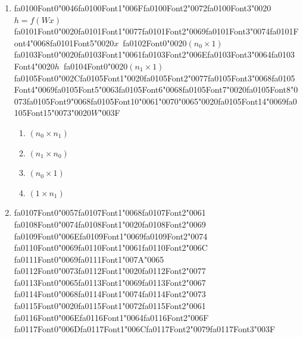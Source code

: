 \documentclass[12pt]{article}
\begin{document}
\begin{enumerate}[label=Q\arabic*.]
\item {\csname fa0100Font0\endcsname\char"0046}{\csname fa0100Font1\endcsname\char"006F}{\csname fa0100Font2\endcsname\char"0072}{\csname fa0100Font3\endcsname\char"0020}$h = f(Wx)${\csname fa0101Font0\endcsname\char"0020}{\csname fa0101Font1\endcsname\char"0077}{\csname fa0101Font2\endcsname\char"0069}{\csname fa0101Font3\endcsname\char"0074}{\csname fa0101Font4\endcsname\char"0068}{\csname fa0101Font5\endcsname\char"0020}$x$\ {\csname fa0102Font0\endcsname\char"0020}$(n_0 \times 1)${\csname fa0103Font0\endcsname\char"0020}{\csname fa0103Font1\endcsname\char"0061}{\csname fa0103Font2\endcsname\char"006E}{\csname fa0103Font3\endcsname\char"0064}{\csname fa0103Font4\endcsname\char"0020}$h$\ {\csname fa0104Font0\endcsname\char"0020}$(n_1 \times 1)${\csname fa0105Font0\endcsname\char"002C}{\csname fa0105Font1\endcsname\char"0020}{\csname fa0105Font2\endcsname\char"0077}{\csname fa0105Font3\endcsname\char"0068}{\csname fa0105Font4\endcsname\char"0069}{\csname fa0105Font5\endcsname\char"0063}{\csname fa0105Font6\endcsname\char"0068}{\csname fa0105Font7\endcsname\char"0020}{\csname fa0105Font8\endcsname\char"0073}{\csname fa0105Font9\endcsname\char"0068}{\csname fa0105Font10\endcsname\char"0061}{\char"0070}{\char"0065}{\char"0020}{\csname fa0105Font14\endcsname\char"0069}{\csname fa0105Font15\endcsname\char"0073}{\char"0020}$W${\char"003F}
\begin{enumerate}[label=(\Alph*)]
    \item $(n_0 \times n_1)$
    \item $(n_1 \times n_0)$
    \item $(n_0 \times 1)$
    \item $(1 \times n_1)$
\end{enumerate}
\item {\csname fa0107Font0\endcsname\char"0057}{\csname fa0107Font1\endcsname\char"0068}{\csname fa0107Font2\endcsname\char"0061} {\csname fa0108Font0\endcsname\char"0074}{\csname fa0108Font1\endcsname\char"0020}{\csname fa0108Font2\endcsname\char"0069} {\csname fa0109Font0\endcsname\char"006E}{\csname fa0109Font1\endcsname\char"0069}{\csname fa0109Font2\endcsname\char"0074} {\csname fa0110Font0\endcsname\char"0069}{\csname fa0110Font1\endcsname\char"0061}{\csname fa0110Font2\endcsname\char"006C} {\csname fa0111Font0\endcsname\char"0069}{\csname fa0111Font1\endcsname\char"007A}{\char"0065} {\csname fa0112Font0\endcsname\char"0073}{\csname fa0112Font1\endcsname\char"0020}{\csname fa0112Font2\endcsname\char"0077} {\csname fa0113Font0\endcsname\char"0065}{\csname fa0113Font1\endcsname\char"0069}{\csname fa0113Font2\endcsname\char"0067} {\csname fa0114Font0\endcsname\char"0068}{\csname fa0114Font1\endcsname\char"0074}{\csname fa0114Font2\endcsname\char"0073} {\csname fa0115Font0\endcsname\char"0020}{\csname fa0115Font1\endcsname\char"0072}{\csname fa0115Font2\endcsname\char"0061} {\csname fa0116Font0\endcsname\char"006E}{\csname fa0116Font1\endcsname\char"0064}{\csname fa0116Font2\endcsname\char"006F} {\csname fa0117Font0\endcsname\char"006D}{\csname fa0117Font1\endcsname\char"006C}{\csname fa0117Font2\endcsname\char"0079}{\csname fa0117Font3\endcsname\char"003F}

\end{enumerate}
\end{document}
